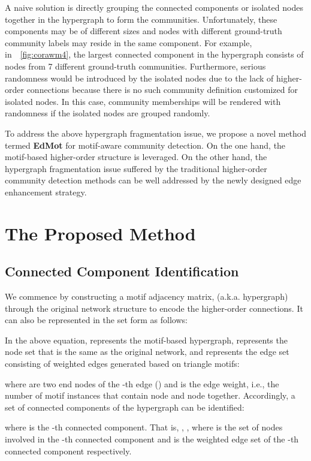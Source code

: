 \documentclass[sigconf]{acmart}
\begin{document}
A naive solution is directly grouping the connected components or isolated nodes together in the hypergraph to form the communities. Unfortunately, these components may be of different sizes and nodes with different ground-truth community labels may reside in the same component. For example, in~\figurename~\ref{fig:corawm4}, the largest connected component in the hypergraph consists of nodes from 7 different ground-truth communities. Furthermore, serious randomness would be introduced by the isolated nodes due to the lack of higher-order connections because there is no such community definition customized for isolated nodes. In this case, community memberships will be rendered with randomness if the isolated nodes are grouped randomly.

To address the above hypergraph fragmentation issue, we propose a novel method termed \textbf{EdMot} for motif-aware community detection. On the one hand, the motif-based higher-order structure is leveraged. On the other hand, the hypergraph fragmentation issue suffered by the traditional higher-order community detection methods can be well addressed by the newly designed edge enhancement strategy.



\section{The Proposed Method}




\subsection{Connected Component Identification}
We commence by constructing a motif adjacency matrix, (a.k.a. hypergraph)  through the original network structure to encode the higher-order connections. It can also be represented in the set form as follows:

In the above equation,  represents the motif-based hypergraph,  represents the node set that is the same as the original network, and  represents the edge set consisting of  weighted edges generated based on triangle motifs:

where  are two end nodes of the -th edge () and  is the edge weight, i.e., the number of motif instances that contain node  and node  together. Accordingly, a set of  connected components of the hypergraph can be identified:

where  is the -th connected component. That is, , , where  is the set of nodes involved in the -th connected component and  is the weighted edge set of the -th connected component respectively.
\end{document}

